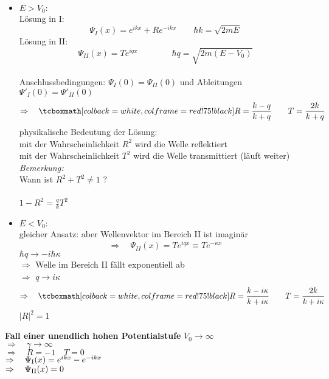 \begin{itemize}
	\item $ E > V_0 : $\\
	Lösung in I:
	\begin{equation*}
	\Psi_{I}(x) = e^{i k x} + R e^{- i k x} \qquad \hbar k = \sqrt{2 m E}
	\end{equation*}
	Lösung in II:
	\begin{equation*}
	\Psi_{II}(x) = T e^{i q x} \qquad \qquad \hbar q = \sqrt{2 m (E - V_0)}
	\end{equation*}
	\\
	Anschlussbedingungen: $ \Psi_{I}(0) = \Psi_{II}(0) $ und Ableitungen $ \Psi'_{I}(0) = \Psi'_{II}(0) $
	\begin{equation*}
	\Rightarrow \quad \rmbox{ R = \frac{k - q}{k + q} \qquad T = \frac{2 k}{k + q} }
	\end{equation*}
	physikalische Bedeutung der Lösung:\\
	mit der Wahrscheinlichkeit $ R^2 $ wird die Welle reflektiert \\
	mit der Wahrscheinlichkeit $ T^2 $ wird die Welle transmittiert (läuft weiter)\\[5pt]
	\emph{Bemerkung:}\\
	Wann ist $ R^2 + T^2 \neq 1 $ ?\\
	\\
	$ 1 - R^2 = \frac{q}{k} T^2 $
	\item $ E < V_0 : $\\
	gleicher Ansatz: aber Wellenvektor im Bereich II ist imaginär
	\begin{equation*}
	\Rightarrow \quad \Psi_{II}(x) = T e^{i q x} \equiv T e^{- \kappa x}
	\end{equation*}
	$ \hbar q \rightarrow - i \hbar \kappa $\\
	$ \Rightarrow $ Welle im Bereich II fällt exponentiell ab\\
	$ \Rightarrow $ $ q \to i \kappa $
	\begin{equation*}
	\Rightarrow \quad \rmbox{ R = \frac{k - i \kappa}{k + i \kappa} \qquad T = \frac{2 k}{k + i \kappa} }
	\end{equation*}
	$ |R|^2 = 1 $\\
\end{itemize}
\textbf{Fall einer unendlich hohen Potentialstufe} $ V_0 \to \infty $\\
$ \Rightarrow \quad \gamma \to \infty $\\
$ \Rightarrow \quad R = - 1 \quad T = 0$\\
$ \Rightarrow \quad \Psi_{\textrm{I}}(x) = e^{i k x} - e^{- i k x} $\\
$ \Rightarrow \quad \Psi_{\textrm{II}}(x) = 0 $

